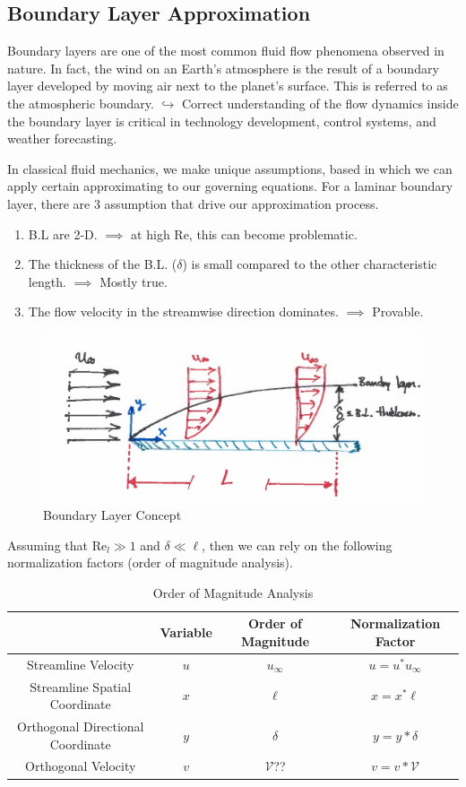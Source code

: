 \subsection*{Boundary Layer Approximation}
Boundary layers are one of the most common fluid flow phenomena observed in nature. In fact, the wind on an Earth's atmosphere is the result of a boundary layer developed by moving air next to the planet's surface. This is referred to as the atmospheric boundary.
$\hookrightarrow$ Correct understanding of the flow dynamics inside the boundary layer is critical in technology development, control systems, and weather forecasting. 

In classical fluid mechanics, we make unique assumptions, based in which we can apply certain approximating to our governing equations. For a laminar boundary layer, there are 3 assumption that drive our approximation process.
\begin{enumerate}
    \item B.L are 2-D. $\implies$ at high Re, this can become problematic.
    \item The thickness of the B.L. ($\delta$) is small compared to the other characteristic length. $\implies$ Mostly true.
    \item The flow velocity in the streamwise direction dominates. $\implies$ Provable.
\end{enumerate}
\begin{figure}
    \centering
    \includegraphics[width=0.5\linewidth]{Lecture Number/Figures/Lecture 6, Jan 30, 2024, Boundary Layer Concept.jpg}
    \caption{Boundary Layer Concept}
    \label{fig:Boundary Layer Concept}
\end{figure}
Assuming that Re$_{l} \gg 1$ and $\delta \ll \ell$, then we can rely on the following normalization factors (order of magnitude analysis).
\begin{table}
    \centering
    \caption{Order of Magnitude Analysis}
    \label{tab:Order of Magnitude Analysis}
    \begin{tabular}{c|ccc}
        & \textbf{Variable} & \textbf{Order of Magnitude} & \textbf{Normalization Factor} \\
        \hline
        Streamline Velocity & $u$ & $u_{\infty}$ & $u = u^* u_{\infty}$ \\
        Streamline Spatial Coordinate & $x$ & $\ell$ & $x = x^* \ell$ \\
        Orthogonal Directional Coordinate & $y$ & $\delta$ & $y = y* \delta$ \\
        Orthogonal Velocity & $v$ & $\mathcal{V}$?? & $v = v* \mathcal{V}$ \\
        \end{tabular}
\end{table}
